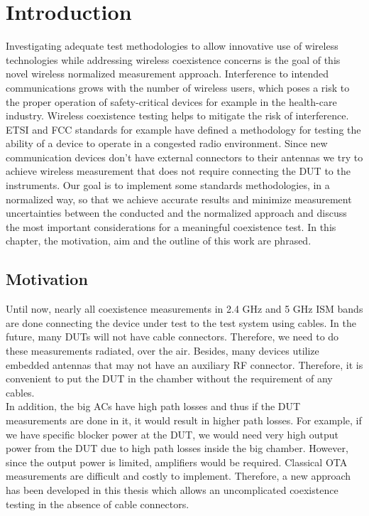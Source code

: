 \chapter{Introduction}
Investigating adequate test methodologies to allow innovative use of wireless technologies while addressing wireless coexistence concerns is the goal of this novel wireless normalized measurement approach. Interference to intended communications grows with the number of wireless users, which poses a risk to the proper operation of safety-critical devices for example in the health-care industry. Wireless coexistence testing helps to mitigate the risk of interference. \acs{ETSI} and \acs{FCC} standards for example have defined a methodology for testing the ability of a device to operate in a congested radio environment. Since new communication devices don't have external connectors to their antennas we try to achieve wireless measurement that does not require connecting the \acs{DUT} to the instruments. Our goal is to implement some standards methodologies, in a normalized way, so that we achieve accurate results and minimize measurement uncertainties between the conducted and the normalized approach and discuss the most important considerations for a meaningful coexistence test. In this chapter, the motivation, aim and the outline of this work are phrased.

\section{Motivation}
Until now, nearly all coexistence measurements in 2.4 GHz and 5 GHz \ac{ISM}  bands are done connecting the device under test to the test system using cables. In the future, many \acsp{DUT} will not have cable connectors. Therefore, we need to do these measurements radiated, over the air. Besides, many devices utilize embedded antennas that may not have an auxiliary \acs{RF} connector. Therefore, it is convenient to put the \acs{DUT} in the chamber without the requirement of any cables. \\

In addition, the big  \acp{AC} have high path losses and thus if the \acs{DUT} measurements are done in it, it would result in higher path losses. For example, if we have specific blocker power at the \acs{DUT}, we would need very high output power from the \acs{DUT} due to high path losses inside the big chamber. However, since the output power is limited, amplifiers would be required. Classical \ac{OTA} measurements are difficult and costly to implement. Therefore, a new approach has been developed in this thesis which allows an uncomplicated coexistence testing in the absence of cable connectors. 


